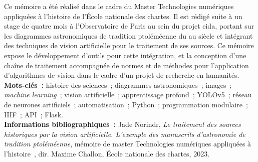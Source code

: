 \medskip	

Ce mémoire a été réalisé dans le cadre du Master Technologies numériques appliquées à l'histoire de l'École nationale des chartes. Il est rédigé suite à un stage de quatre mois à  l'Observatoire de Paris au sein du projet \acrshort{eida}, portant sur les diagrammes astronomiques de tradition ptoléméenne du \viii au \xviii siècle et intégrant des techniques de vision artificielle pour le traitement de ses sources. Ce mémoire expose le développement d'outils pour cette intégration, et la conception d'une chaîne de traitement accompagnée de normes et de méthodes pour l'application d'algorithmes de vision dans le cadre d'un projet de recherche en humanités.\\

\textbf{Mots-clés~:} histoire des sciences~; diagrammes astronomiques~; images~; \textit{machine learning}~; vision artificielle~; apprentissage profond~; YOLOv5~; réseau de neurones artificiels~; automatisation~; Python~; programmation modulaire~; IIIF~; API~; Flask.\\

\textbf{Informations bibliographiques~:} Jade Norindr, \textit{Le traitement des sources historiques par la vision artificielle. L'exemple des manuscrits d'astronomie de tradition ptoléméenne}, mémoire de master \og Technologies numériques appliquées à l'histoire~\fg, dir. Maxime Challon, École nationale des chartes, 2023.	
\clearemptydoublepage
